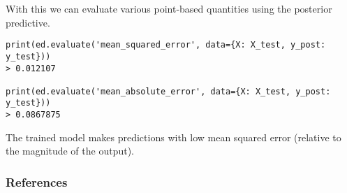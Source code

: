 With this we can evaluate various point-based quantities using the posterior
predictive.
\begin{lstlisting}
print(ed.evaluate('mean_squared_error', data={X: X_test, y_post: y_test}))
> 0.012107

print(ed.evaluate('mean_absolute_error', data={X: X_test, y_post: y_test}))
> 0.0867875
\end{lstlisting}

The trained model makes predictions with low mean squared error
(relative to the magnitude of the output).

\subsubsection{References}\label{references}
